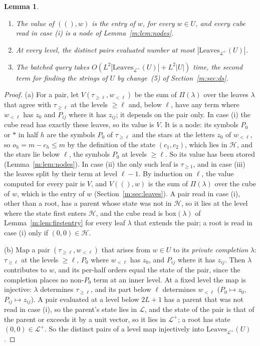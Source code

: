 \documentclass[11pt]{article}
\newtheorem{lemma}[theorem]{Lemma}
\theoremstyle{definition}
\theoremstyle{remark}
\newcommand{\Leaves}{\mathrm{Leaves}}
\begin{document}
\begin{lemma}\label{m:lem:colquery}
\begin{enumerate}[label=(\alph*),nosep]
\item The value of $((),w)$ is the entry of $w$, for every $w\in U$, and every cube read in case (i) is a node of Lemma~\ref{m:lem:nodes}.
\item At every level, the distinct pairs evaluated number at most $|\Leaves_{\mathcal L^+}(U)|$.
\item The batched query takes $O(L^2|\Leaves_{\mathcal L^+}(U)|+L^2|U|)$ time, the second term for finding the strings of $U$ by change~(5) of Section~\ref{m:sec:ds}.
\end{enumerate}
\end{lemma}

\begin{proof}
(a) For a pair, let $V(\tau_{\ge\ell},w_{<\ell})$ be the sum of $\Pi(\lambda)$ over the leaves $\lambda$ that agree with $\tau_{\ge\ell}$ at the levels $\ge\ell$ and, below $\ell$, have any term where $w_{<\ell}$ has $z_0$ and $P_{ij}$ where it has $z_{ij}$; it depends on the pair only. In case (i) the cube read has exactly these leaves, so its value is $V$. It is a node: its symbols $P_0$ or $\ast$ in half $h$ are the symbols $P_0$ of $\tau_{\ge\ell}$ and the stars at the letters $z_0$ of $w_{<\ell}$, so $o_h=m-c_h\le m$ by the definition of the state $(c_1,c_2)$, which lies in $\mathcal H$, and the stars lie below $\ell$, the symbols $P_0$ at levels $\ge\ell$. So its value has been stored (Lemma~\ref{m:lem:nodes}). In case (ii) the only such leaf is $\tau_{\ge1}$, and in case (iii) the leaves split by their term at level $\ell-1$. By induction on $\ell$, the value computed for every pair is $V$, and $V((),w)$ is the sum of $\Pi(\lambda)$ over the cube of $w$, which is the entry of $w$ (Section~\ref{m:sec:leaves}). A pair read in case (i), other than a root, has a parent whose state was not in $\mathcal H$, so it lies at the level where the state first enters $\mathcal H$, and the cube read is $\mathrm{box}(\lambda)$ of Lemma~\ref{m:lem:firstentry} for every leaf $\lambda$ that extends the pair; a root is read in case (i) only if $(0,0)\in\mathcal H$.

(b) Map a pair $(\tau_{\ge\ell},w_{<\ell})$ that arises from $w\in U$ to its \emph{private completion} $\lambda$: $\tau_{\ge\ell}$ at the levels $\ge\ell$, $P_0$ where $w_{<\ell}$ has $z_0$, and $P_{ij}$ where it has $z_{ij}$. Then $\lambda$ contributes to $w$, and its per-half orders equal the state of the pair, since the completion places no non-$P_0$ term at an inner level. At a fixed level the map is injective: $\lambda$ determines $\tau_{\ge\ell}$, and its part below $\ell$ determines $w_{<\ell}$ ($P_0\mapsto z_0$, $P_{ij}\mapsto z_{ij}$). A pair evaluated at a level below $2L+1$ has a parent that was not read in case (i), so the parent's state lies in $\mathcal L$, and the state of the pair is that of the parent or exceeds it by a unit vector, so it lies in $\mathcal L^+$; a root has state $(0,0)\in\mathcal L^+$. So the distinct pairs of a level map injectively into $\Leaves_{\mathcal L^+}(U)$.


\end{proof}
\end{document}
